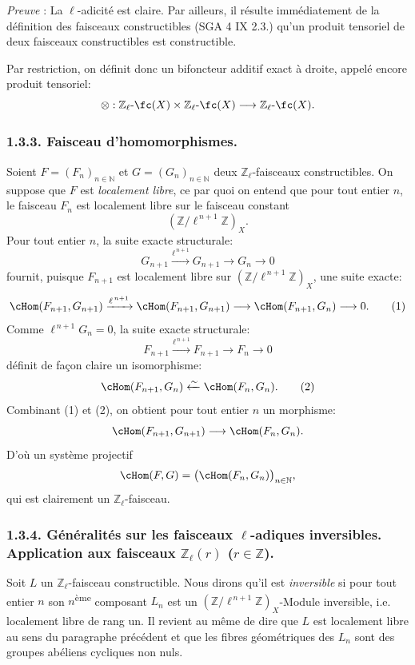 \emph{Preuve} : La \(\ell\)-adicité est claire. Par ailleurs, il résulte immédiatement de la définition des faisceaux constructibles (SGA 4 IX 2.3.) qu'un produit tensoriel de deux faisceaux constructibles est constructible.

Par restriction, on définit donc un bifoncteur additif exact à droite, appelé encore produit tensoriel:
\[
\otimes:\mathbb{Z}_\ell\text{-}\fc(X)\times \mathbb{Z}_\ell\text{-}\fc(X)
\longrightarrow \mathbb{Z}_\ell\text{-}\fc(X).
\]

\subsubsection*{1.3.3. Faisceau d'homomorphismes.}

Soient \(F=(F_n)_{n\in\mathbb{N}}\) et \(G=(G_n)_{n\in\mathbb{N}}\) deux \(\mathbb{Z}_\ell\)-faisceaux constructibles. On suppose que \(F\) est \emph{localement libre}, ce par quoi on entend que pour tout entier \(n\), le faisceau \(F_n\) est localement libre sur le faisceau constant
\[
(\mathbb{Z}/\ell^{\,n+1}\mathbb{Z})_X.
\]
Pour tout entier \(n\), la suite exacte structurale:
\[
G_{n+1}\xrightarrow{\ell^{\,n+1}}G_{n+1}\longrightarrow G_n\longrightarrow 0
\]
fournit, puisque \(F_{n+1}\) est localement libre sur \((\mathbb{Z}/\ell^{\,n+1}\mathbb{Z})_X\), une suite exacte:
\[
\cHom(F_{n+1},G_{n+1})
 \xrightarrow{\ell^{\,n+1}}
\cHom(F_{n+1},G_{n+1})
 \longrightarrow
\cHom(F_{n+1},G_n)
 \longrightarrow 0.
\tag{1}
\]
Comme \(\ell^{\,n+1}G_n=0\), la suite exacte structurale:
\[
F_{n+1}\xrightarrow{\ell^{\,n+1}}F_{n+1}\longrightarrow F_n\longrightarrow 0
\]
définit de façon claire un isomorphisme:
\[
\cHom(F_{n+1},G_n)\xleftarrow{\sim}\cHom(F_n,G_n).
\tag{2}
\]
Combinant (1) et (2), on obtient pour tout entier \(n\) un morphisme:
\[
\cHom(F_{n+1},G_{n+1})\longrightarrow \cHom(F_n,G_n).
\]
D'où un système projectif
\[
\cHom(F,G)=\bigl(\cHom(F_n,G_n)\bigr)_{n\in\mathbb{N}},
\]
qui est clairement un \(\mathbb{Z}_\ell\)-faisceau.

\subsubsection*{1.3.4. Généralités sur les faisceaux \(\ell\)-adiques inversibles. Application aux faisceaux \(\mathbb{Z}_\ell(r)\) (\(r\in\mathbb{Z}\)).}

Soit \(L\) un \(\mathbb{Z}_\ell\)-faisceau constructible. Nous dirons qu'il est \emph{inversible} si pour tout entier \(n\) son \(n\)\textsuperscript{ème} composant \(L_n\) est un \((\mathbb{Z}/\ell^{\,n+1}\mathbb{Z})_X\)-Module inversible, i.e. localement libre de rang un. Il revient au même de dire que \(L\) est localement libre au sens du paragraphe précédent et que les fibres géométriques des \(L_n\) sont des groupes abéliens cycliques non nuls.

